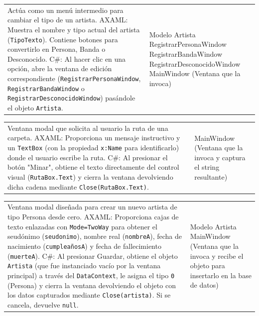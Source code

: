 \documentclass{article}
\newcommand{\tarjeta}[3]{%
      \begin{center}
      \begin{tabular}{|>{\raggedright\arraybackslash}p{7.8cm}|>{\raggedright\arraybackslash}p{4.2cm}|}
        \hline
        \multicolumn{2}{|c|}{#1} \\ \hline
        #2 & #3 \\ \hline
      \end{tabular}
      \end{center}
    }
\begin{document}
    \tarjeta{RegistrarArtistaWindow (Ventana Secundaria)}
    {Actúa como un menú intermedio para cambiar el tipo de un artista.\newline
    AXAML: Muestra el nombre y tipo actual del artista (\texttt{TipoTexto}). Contiene botones para convertirlo en Persona, Banda o Desconocido.\newline
    C\#: Al hacer clic en una opción, abre la ventana de edición correspondiente (\texttt{RegistrarPersonaWindow}, \texttt{RegistrarBandaWindow} o \texttt{RegistrarDesconocidoWindow}) pasándole el objeto \texttt{Artista}.}
    {Modelo Artista\newline
    RegistrarPersonaWindow\newline
    RegistrarBandaWindow\newline
    RegistrarDesconocidoWindow\newline
    MainWindow (Ventana que la invoca)}
        

\tarjeta{MinarWindow (Ventana de Diálogo)}
{Ventana modal que solicita al usuario la ruta de una carpeta.\newline
AXAML: Proporciona un mensaje instructivo y un \texttt{TextBox} (con la propiedad \texttt{x:Name} para identificarlo) donde el usuario escribe la ruta.\newline
C\#: Al presionar el botón "Minar", obtiene el texto directamente del control visual (\texttt{RutaBox.Text}) y cierra la ventana devolviendo dicha cadena mediante \texttt{Close(RutaBox.Text)}.}
{MainWindow (Ventana que la invoca y captura el string resultante)}


\tarjeta{AgregarPersonaWindow (Ventana Secundaria)}
{Ventana modal diseñada para crear un nuevo artista de tipo Persona desde cero.\newline
AXAML: Proporciona cajas de texto enlazadas con \texttt{Mode=TwoWay} para obtener el seudónimo (\texttt{seudonimo}), nombre real (\texttt{nombreA}), fecha de nacimiento (\texttt{cumpleañosA}) y fecha de fallecimiento (\texttt{muerteA}).\newline
C\#: Al presionar Guardar, obtiene el objeto \texttt{Artista} (que fue instanciado vacío por la ventana principal) a través del \texttt{DataContext}, le asigna el tipo \texttt{0} (Persona) y cierra la ventana devolviendo el objeto con los datos capturados mediante \texttt{Close(artista)}. Si se cancela, devuelve \texttt{null}.}
{Modelo Artista\newline
MainWindow (Ventana que la invoca y recibe el objeto para insertarlo en la base de datos)}
\end{document}
